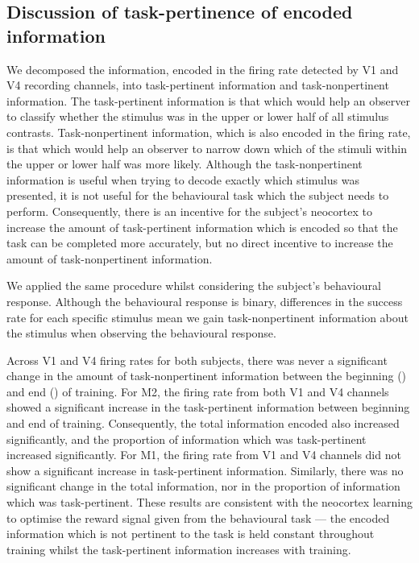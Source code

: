 \subsection{Discussion of task-pertinence of encoded information}

We decomposed the information, encoded in the firing rate detected by \ac{V1} and \ac{V4} recording channels, into task-pertinent information and task-nonpertinent information.
The task-pertinent information is that which would help an observer to classify whether the stimulus was in the upper or lower half of all stimulus contrasts.
Task-nonpertinent information, which is also encoded in the firing rate, is that which would help an observer to narrow down which of the stimuli within the upper or lower half was more likely.
Although the task-nonpertinent information is useful when trying to decode exactly which stimulus was presented, it is not useful for the behavioural task which the subject needs to perform.
Consequently, there is an incentive for the subject's neocortex to increase the amount of task-pertinent information which is encoded so that the task can be completed more accurately, but no direct incentive to increase the amount of task-nonpertinent information.

We applied the same procedure whilst considering the subject's behavioural response.
Although the behavioural response is binary, differences in the success rate for each specific stimulus mean we gain task-nonpertinent information about the stimulus when observing the behavioural response.

Across \ac{V1} and \ac{V4} firing rates for both subjects, there was never a significant change in the amount of task-nonpertinent information between the beginning () and end () of training.
For \ac{M2}, the firing rate from both \ac{V1} and \ac{V4} channels showed a significant increase in the task-pertinent information between beginning and end of training.
Consequently, the total information encoded also increased significantly, and the proportion of information which was task-pertinent increased significantly.
For \ac{M1}, the firing rate from \ac{V1} and \ac{V4} channels did not show a significant increase in task-pertinent information.
Similarly, there was no significant change in the total information, nor in the proportion of information which was task-pertinent.
These results are consistent with the neocortex learning to optimise the reward signal given from the behavioural task --- the encoded information which is not pertinent to the task is held constant throughout training whilst the task-pertinent information increases with training.

